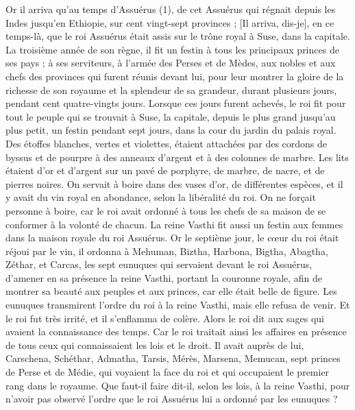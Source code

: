 \BFont
\begin{multicols}{2}
\VerseOne{}Or il arriva qu’au temps d’Assuérus (1), de cet Assuérus qui régnait depuis les Indes jusqu'en Ethiopie, sur cent vingt-sept provinces ;
[Il arriva, dis-je], en ce temps-là, que le roi Assuérus était assis sur le trône royal à Suse, dans la capitale.
La troisième année de son règne, il fit un festin à tous les principaux princes de ses pays ; à ses serviteurs, à l’armée des Perses et de Mèdes, aux nobles et aux chefs des provinces qui furent réunis devant lui,
pour leur montrer la gloire de la richesse de son royaume et la splendeur de sa grandeur, durant plusieurs jours, pendant cent quatre-vingts jours.
Lorsque ces jours furent achevés, le roi fit pour tout le peuple qui se trouvait à Suse, la capitale, depuis le plus grand jusqu'au plus petit, un festin pendant sept jours, dans la cour du jardin du palais royal.
Des étoffes blanches, vertes et violettes, étaient attachées par des cordons de byssus et de pourpre à des anneaux d'argent et à des colonnes de marbre. Les lits étaient d'or et d'argent sur un pavé de porphyre, de marbre, de nacre, et de pierres noires.
On servait à boire dans des vases d'or, de différentes espèces, et il y avait du vin royal en abondance, selon la libéralité du roi.
On ne forçait personne à boire, car le roi avait ordonné à tous les chefs de sa maison de se conformer à la volonté de chacun.
La reine Vasthi fit aussi un festin aux femmes dans la maison royale du roi Assuérus.
Or le septième jour, le cœur du roi était réjoui par le vin, il ordonna à Mehuman, Biztha, Harbona, Bigtha, Abagtha, Zéthar, et Carcas, les sept eunuques qui servaient devant le roi Assuérus,
d’amener en sa présence la reine Vasthi, portant la couronne royale, afin de montrer sa beauté aux peuples et aux princes, car elle était belle de figure.
Les eunuques transmirent l’ordre du roi à la reine Vasthi, mais elle refusa de venir. Et le roi fut très irrité, et il s’enflamma de colère.
Alors le roi dit aux sages qui avaient la connaissance des temps. Car le roi traitait ainsi les affaires en présence de tous ceux qui connaissaient les lois et le droit.
Il avait auprès de lui, Carschena, Schéthar, Admatha, Tarsis, Mérès, Marsena, Memucan, sept princes de Perse et de Médie, qui voyaient la face du roi et qui occupaient le premier rang dans le royaume.
Que faut-il faire dit-il, selon les lois, à la reine Vasthi, pour n'avoir pas observé l’ordre que le roi Assuérus lui a ordonné par les eunuques ?

\end{multicols}
